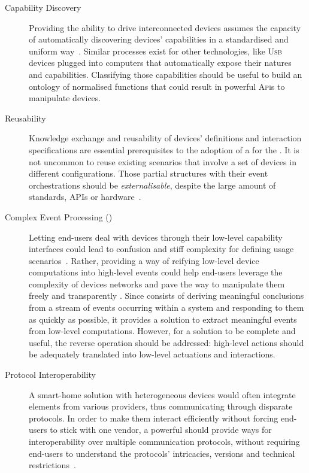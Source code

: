 \begin{description}
	\item[Capability Discovery] Providing the ability to drive interconnected devices assumes the capacity of automatically discovering devices' capabilities in a standardised and uniform way~\cite{chaqfeh-12}. Similar processes exist for other technologies, like \textsc{Usb} devices plugged into computers that automatically expose their natures and capabilities. Classifying those capabilities should be useful to build an ontology of normalised functions that could result in powerful \textsc{Api}s to manipulate devices. 
	
	\item[Reusability] Knowledge exchange and reusability of devices' definitions and interaction specifications are essential prerequisites to the adoption of a \DSL for the \IOT. It is not uncommon to reuse existing scenarios that involve a set of devices in different configurations. Those partial \IOT structures with their event orchestrations should be \textit{externalisable}, despite the large amount of standards, \textsc{API}s or hardware~\cite{ma-14}.

	\item[Complex Event Processing (\CEP)] Letting end-users deal with devices through their low-level capability interfaces could lead to confusion and stiff complexity for defining usage scenarios~\cite{ma-13}. Rather, providing a way of reifying low-level device computations into high-level events could help end-users leverage the complexity of devices networks and pave the way to manipulate them freely and transparently \cite{cugola-12}. Since \CEP consists of deriving meaningful conclusions from a stream of events occurring within a system and responding to them as quickly as possible, it provides a solution to extract meaningful events from low-level computations. However, for a solution to be complete and useful, the reverse operation should be addressed: high-level actions should be adequately translated into low-level actuations and interactions.
	
	\item[Protocol Interoperability] A smart-home solution with heterogeneous devices would often integrate elements from various providers, thus communicating through disparate protocols. In order to make them interact efficiently without forcing end-users to stick with one vendor, a powerful \DSL should provide ways for interoperability over multiple communication protocols, without requiring end-users to understand the protocols' intricacies, versions and technical restrictions~\cite{gubbi-13}.
	

\end{description}

